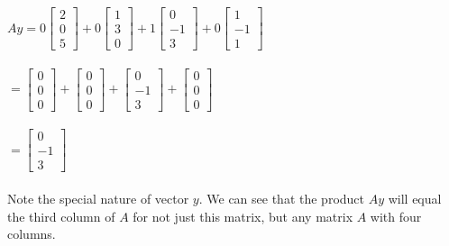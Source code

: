 {$Ay =
0  \left[ \begin{array}{c} 2 \\ 0 \\ 5 \end{array} \right] + 
0  \left[ \begin{array}{c} 1 \\ 3 \\ 0 \end{array} \right] +
1  \left[ \begin{array}{c} 0 \\ -1 \\ 3 \end{array} \right] +
0  \left[ \begin{array}{c} 1 \\ -1  \\ 1 \end{array} \right] $ \\ \\

$ = 
\left[ \begin{array}{c} 0 \\ 0 \\ 0 \end{array} \right] + 
\left[ \begin{array}{c} 0 \\ 0 \\ 0 \end{array} \right] +
\left[ \begin{array}{c} 0 \\ -1 \\ 3 \end{array} \right] +
\left[ \begin{array}{c} 0 \\ 0 \\ 0 \end{array} \right] $ \\ \\

$ = \left[ \begin{array}{c} 0 \\ -1 \\ 3 \end{array} \right] $ \\ \\

Note the special nature of vector $y$. We can see that the product $Ay$ will equal the third column of $A$ for not just this matrix, but any matrix $A$ with four columns. 
	
}


